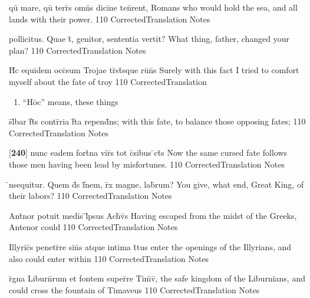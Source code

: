 \documentclass[]{book}
\begin{document}
\latline
  {qu\={\macron {\i}} mare, qu\={\macron {\i}} terr\={}s omn\={\macron {\i}}s dici\={}ne ten\={}rent,}
  { Romans who would hold the sea, and all lands with their power. }
  {110}
  { CorrectedTranslation }
  { Notes }


\latline
  {pollicitus.  Quae t\={}, genitor, sententia vertit?}
  { What thing, father, changed your plan? }
  {110}
  { CorrectedTranslation }
  { Notes }


\latline
  {H\={}c equidem occ\={}sum Trojae tr\={\macron {\i}}st\={\macron {\i}}sque ru\={\macron {\i}}n\={}s}
  { Surely with this fact I tried to comfort myself about the fate of troy }
  {110}
  { CorrectedTranslation }
  { \begin{enumerate}
  	\item ``H\={o}c'' means, these things
  \end{enumerate} }


\latline
  {s\={}l\={}bar f\={}t\={\macron {\i}}s contr\={}ria f\={}ta repend\={}ns;}
  { with this fate, to balance those opposing fates; }
  {110}
  { CorrectedTranslation }
  { Notes }


\latline
  {[\textbf{240}] nunc eadem fort\={}na vir\={}s tot c\={}sibus \={}ct\={}s}
  { Now the same cursed fate follows those men having been lead by misfortunes. }
  {110}
  { CorrectedTranslation }
  { Notes }


\latline
  {\={\macron {\i}}nsequitur.  Quem d\={}s f\={\macron {\i}}nem, r\={}x magne, lab\={}rum?}
  { You give, what end, Great King, of their labors? }
  {110}
  { CorrectedTranslation }
  { Notes }


\latline
  {Ant\={}nor potuit medi\={\macron {\i}}s \={}l\={}psus Ach\={\macron {\i}}v\={\macron {\i}}s}
  { Having escaped from the midst of the Greeks, Antenor could }
  {110}
  { CorrectedTranslation }
  { Notes }


\latline
  {Illyric\={}s penetr\={}re sin\={}s atque intima t\={}tus}
  { enter the openings of the Illyrians, and also could enter within }
  {110}
  { CorrectedTranslation }
  { Notes }


\latline
  {r\={}gna Liburn\={}rum et fontem super\={}re Tim\={}v\={\macron {\i}},}
  { the safe kingdom of the Liburnians, and could cross the fountain of Timaveus }
  {110}
  { CorrectedTranslation }
  { Notes }
\end{document}
